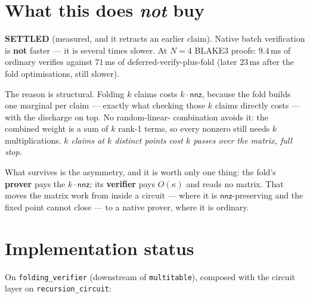 \documentclass[11pt]{article}
\newcommand{\nnz}{\mathsf{nnz}}
\newcommand{\code}[1]{\texttt{#1}}
\newcommand{\settled}[1]{\medskip\noindent\textbf{SETTLED} (#1).\xspace}
\theoremstyle{definition}
\begin{document}
\section{What this does \emph{not} buy}\label{sec:notbuy}

\settled{measured, and it retracts an earlier claim} Native batch
verification is \textbf{not} faster --- it is several times slower. At
$N = 4$ BLAKE3 proofs: $9.4$\,ms of ordinary verifies against $71$\,ms of
deferred-verify-plus-fold (later $23$\,ms after the fold optimisations, still
slower).

The reason is structural. Folding $k$ claims costs $k \cdot \nnz$, because
the fold builds one marginal per claim --- exactly what checking those $k$
claims directly costs --- with the discharge on top. No random-linear-
combination avoids it: the combined weight is a sum of $k$ rank-1 terms, so
every nonzero still needs $k$ multiplications. \emph{$k$ claims at $k$
distinct points cost $k$ passes over the matrix, full stop.}

What survives is the asymmetry, and it is worth only one thing: the fold's
\textbf{prover} pays the $k\cdot\nnz$; its \textbf{verifier} pays
$O(\kappa)$ and reads no matrix. That moves the matrix work from inside a
circuit --- where it is $\nnz$-preserving and the fixed point cannot close
--- to a native prover, where it is ordinary.

\section{Implementation status}\label{sec:status}

On \code{folding\_verifier} (downstream of \code{multitable}), composed with
the circuit layer on \code{recursion\_circuit}:
\end{document}
